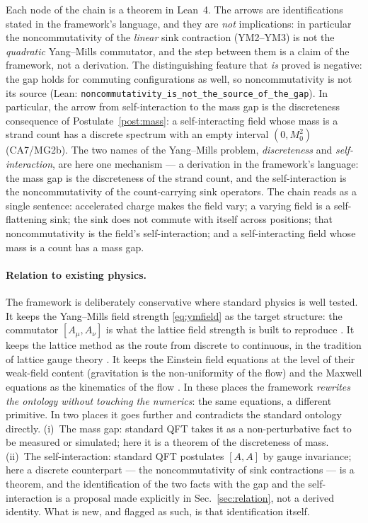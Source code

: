 \documentclass[aps,prd,preprint,superscriptaddress,amsmath,amssymb]{revtex4-2}
\begin{document}
Each node of the chain is a theorem in Lean~4.  The arrows are
identifications stated in the framework's language, and they are
\emph{not} implications: in particular the noncommutativity of the
\emph{linear} sink contraction (YM2--YM3) is not the \emph{quadratic}
Yang--Mills commutator, and the step between them is a claim of the
framework, not a derivation.  The distinguishing feature that \emph{is}
proved is negative: the gap holds for commuting configurations as well, so
noncommutativity is not its source (Lean:
\texttt{noncommutativity\_is\_not\_the\_source\_of\_the\_gap}).  In particular, the
arrow from self-interaction to the mass gap is the discreteness
consequence of Postulate~\ref{post:mass}: a self-interacting field
whose mass is a strand count has a discrete spectrum with an empty
interval $(0,M_0^2)$ (CA7/MG2b).  The two names of the Yang--Mills
problem, \emph{discreteness} and \emph{self-interaction}, are here
one mechanism --- a derivation in the framework's language: the
mass gap is the discreteness of the strand count, and the
self-interaction is the noncommutativity of the count-carrying sink
operators.  The chain reads as a single sentence: accelerated
charge makes the field vary; a varying field is a self-flattening
sink; the sink does not commute with itself across positions; that
noncommutativity is the field's self-interaction; and a
self-interacting field whose mass is a count has a mass gap.

\paragraph{Relation to existing physics.}
The framework is deliberately conservative where standard physics is
well tested.  It keeps the Yang--Mills field strength
\eqref{eq:ymfield} as the target structure: the commutator
$[A_\mu,A_\nu]$ is what the lattice field strength is built to
reproduce \cite{yang1954conservation,peskin1995introduction}.  It
keeps the lattice method as the route from discrete to continuous,
in the tradition of lattice gauge theory \cite{morningstar1999glueball,
chen2006glueball}.  It keeps the Einstein field equations at the
level of their weak-field content (gravitation is the
non-uniformity of the flow) and the Maxwell equations as the
kinematics of the flow \cite{einstein1915feldgleichungen,
gordon1923lichtfortpflanzung,maxwell1996dynamical}.  In these places
the framework \emph{rewrites the ontology without touching the
numerics}: the same equations, a different primitive.  In two places
it goes further and contradicts the standard ontology directly.
(i)~The mass gap: standard QFT takes it as a non-perturbative fact
to be measured or simulated; here it is a theorem of the discreteness
of mass.  (ii)~The self-interaction: standard QFT postulates
$[A,A]$ by gauge invariance; here a discrete counterpart --- the
noncommutativity of sink contractions --- is a theorem, and the
identification of the two facts with the gap and the
self-interaction is a proposal made explicitly in
Sec.~\ref{sec:relation}, not a derived identity.  What is new,
and flagged as such, is that identification itself.
\end{document}
